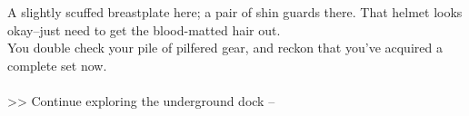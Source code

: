 A slightly scuffed breastplate here; a pair of shin guards there. That helmet looks okay--just need to get the blood-matted hair out.\\

You double check your pile of pilfered gear, and reckon that you’ve acquired a complete set now.\\
\\

>> Continue exploring the underground dock -- 